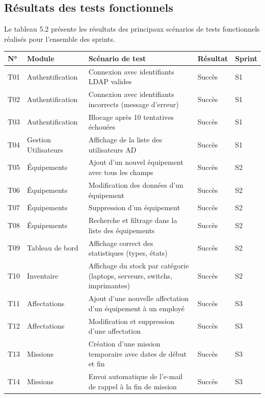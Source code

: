 \subsection{Résultats des tests fonctionnels}

Le tableau 5.2 présente les résultats des principaux scénarios de tests fonctionnels réalisés pour l'ensemble des sprints.

\begin{longtable}{|m{1cm}|m{3cm}|m{5.5cm}|m{1.5cm}|m{1.5cm}|}
\hline
\textbf{N°} & \textbf{Module} & \textbf{Scénario de test} & \textbf{Résultat} & \textbf{Sprint} \\
\hline
\endhead
\endfoot
\endlastfoot
\hline
T01 & Authentification & Connexion avec identifiants LDAP valides & Succès & S1 \\
\hline
T02 & Authentification & Connexion avec identifiants incorrects (message d'erreur) & Succès & S1 \\
\hline
T03 & Authentification & Blocage après 10 tentatives échouées & Succès & S1 \\
\hline
T04 & Gestion Utilisateurs & Affichage de la liste des utilisateurs AD & Succès & S1 \\
\hline
T05 & Équipements & Ajout d'un nouvel équipement avec tous les champs & Succès & S2 \\
\hline
T06 & Équipements & Modification des données d'un équipement & Succès & S2 \\
\hline
T07 & Équipements & Suppression d'un équipement & Succès & S2 \\
\hline
T08 & Équipements & Recherche et filtrage dans la liste des équipements & Succès & S2 \\
\hline
T09 & Tableau de bord & Affichage correct des statistiques (types, états) & Succès & S2 \\
\hline
T10 & Inventaire & Affichage du stock par catégorie (laptops, serveurs, switchs, imprimantes) & Succès & S2 \\
\hline
T11 & Affectations & Ajout d'une nouvelle affectation d'un équipement à un employé & Succès & S3 \\
\hline
T12 & Affectations & Modification et suppression d'une affectation & Succès & S3 \\
\hline
T13 & Missions & Création d'une mission temporaire avec dates de début et fin & Succès & S3 \\
\hline
T14 & Missions & Envoi automatique de l'e-mail de rappel à la fin de mission & Succès & S3 \\
\hline

\end{longtable}
